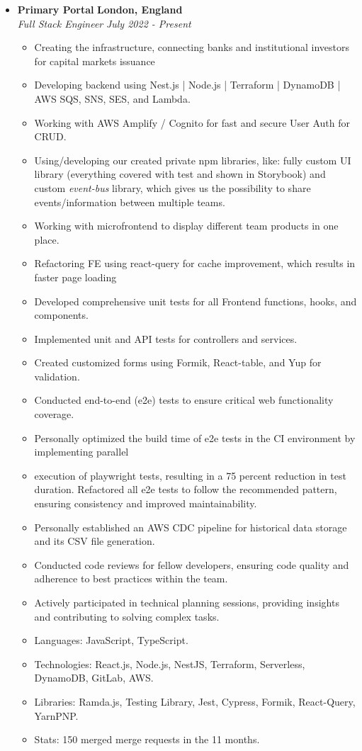 \documentclass[10pt,letterpaper]{article}
\begin{document}
  \begin{itemize}
    \item[]

    {\textbf{Primary Portal} \hfill
    \textbf{London, England}}
  \\
  {\emph{Full Stack Engineer} \hfill \emph{July 2022 - Present}}

  \begin{itemize}[label=\textbullet]
  \itemsep0.5em
  \item Creating the infrastructure, connecting banks and institutional investors for capital markets issuance
  \item Developing backend using Nest.js | Node.js | Terraform | DynamoDB | AWS SQS, SNS, SES, and Lambda.
  \item Working with AWS Amplify / Cognito for fast and secure User Auth for CRUD.
  \item Using/developing our created private npm libraries, like: fully custom UI library (everything covered with test and shown in Storybook) and custom \emph{event-bus} library, which gives us the possibility to share events/information between multiple teams.
  \item Working with microfrontend to display different team products in one place.
  \item Refactoring FE using react-query for cache improvement, which results in faster page loading 
  \item Developed comprehensive unit tests for all Frontend functions, hooks, and components.
  \item Implemented unit and API tests for controllers and services.
  \item Created customized forms using Formik, React-table, and Yup for validation.
  \item Conducted end-to-end (e2e) tests to ensure critical web functionality coverage.
  \item Personally optimized the build time of e2e tests in the CI environment by implementing parallel   \item execution of playwright tests, resulting in a 75 percent reduction in test duration.
Refactored all e2e tests to follow the recommended pattern, ensuring consistency and improved maintainability.
  \item Personally established an AWS CDC pipeline for historical data storage and its CSV file generation.
  \item Conducted code reviews for fellow developers, ensuring code quality and adherence to best practices within the team.
  \item Actively participated in technical planning sessions, providing insights and contributing to solving complex tasks.  
  \item Languages: JavaScript, TypeScript.
  \item Technologies: React.js, Node.js, NestJS, Terraform, Serverless, DynamoDB, GitLab, AWS.
  \item Libraries: Ramda.js, Testing Library, Jest, Cypress, Formik, React-Query, YarnPNP.
  \item Stats: 150 merged merge requests in the 11 months.


\end{itemize}
\end{itemize}
\end{document}
